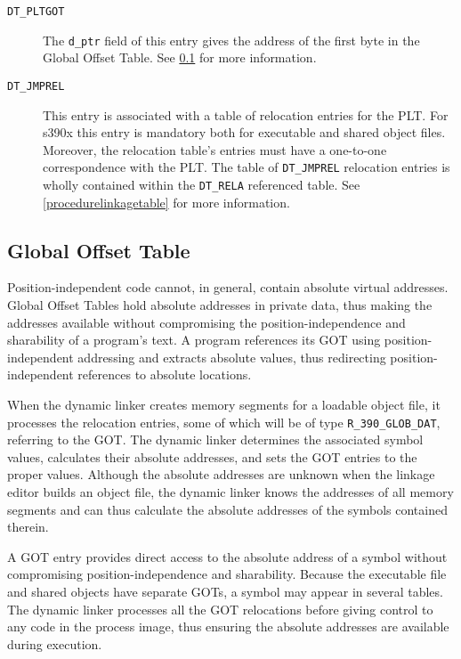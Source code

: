 \documentclass[english,11pt,twoside,toc=bib,toc=idx]{scrreprt}
\newcommand{\ABINAME}{s390x}
\newcommand{\ABINAME}{s390}
\begin{document}
\begin{description}
\item[\texttt{DT\_PLTGOT}] The \texttt{d\_ptr} field of this entry gives
  the address of the first byte in the Global Offset Table.  See
  \cref{globaloffsettable} for more information.

\item[\texttt{DT\_JMPREL}] This entry is associated with a table of
  relocation entries for the PLT\@.  For \ABINAME{} this entry is
  mandatory both for executable and shared object files.  Moreover,
  the relocation table's entries must have a one-to-one correspondence
  with the PLT\@.  The table of \texttt{DT\_JMPREL} relocation entries
  is wholly contained within the \texttt{DT\_RELA} referenced table.
  See \cref{procedurelinkagetable} for more information.
\end{description}

\subsection{Global Offset Table}
\label{globaloffsettable}
Position-independent code cannot, in general, contain absolute virtual
addresses.  Global Offset Tables hold absolute addresses in private
data, thus making the addresses available without compromising the
position-independence and sharability of a program's text.  A program
references its GOT using position-independent addressing and extracts
absolute values, thus redirecting position-independent references to
absolute locations.

When the dynamic linker creates memory segments for a loadable object
file, it processes the relocation entries, some of which will be of
type \texttt{R\_390\_GLOB\_DAT}, referring to the GOT\@.  The dynamic
linker determines the associated symbol values, calculates their
absolute addresses, and sets the GOT entries to the proper
values.  Although the absolute addresses are unknown when the linkage
editor builds an object file, the dynamic linker knows the addresses
of all memory segments and can thus calculate the absolute addresses
of the symbols contained therein.

A GOT entry provides direct access to the absolute address of a symbol
without compromising position-independence and sharability.  Because
the executable file and shared objects have separate GOTs, a symbol
may appear in several tables.  The dynamic linker processes all the
GOT relocations before giving control to any code in the process
image, thus ensuring the absolute addresses are available during
execution.
\end{document}
